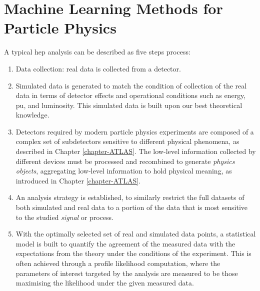 \section{Machine Learning Methods for Particle Physics}
A typical \gls{hep} analysis can be described as five steps process:
\begin{enumerate}
    \item Data collection: real data is collected from a detector. 
    \item Simulated data is generated to match the condition of collection of the real data in terms of detector effects and operational conditions such as energy, \gls{pu}, and luminosity. This simulated data is built upon our best theoretical knowledge. 
    \item Detectors required by modern particle physics experiments are composed of a complex set of subdetectors sensitive to different physical phenomena, as described in Chapter \ref{chapter-ATLAS}. The low-level information collected by different devices must be processed and recombined to generate \textit{physics objects}, aggregating low-level information to hold physical meaning, as introduced in Chapter \ref{chapter-ATLAS}.
    \item An analysis strategy is established, to similarly restrict the full datasets of both simulated and real data to a portion of the data that is most sensitive to the studied \textit{signal} or process.
    \item With the optimally selected set of real and simulated data points, a statistical model is built to quantify the agreement of the measured data with the expectations from the theory under the conditions of the experiment. This is often achieved through a profile likelihood computation, where the parameters of interest targeted by the analysis are measured to be those maximising the likelihood under the given measured data.
\end{enumerate}

